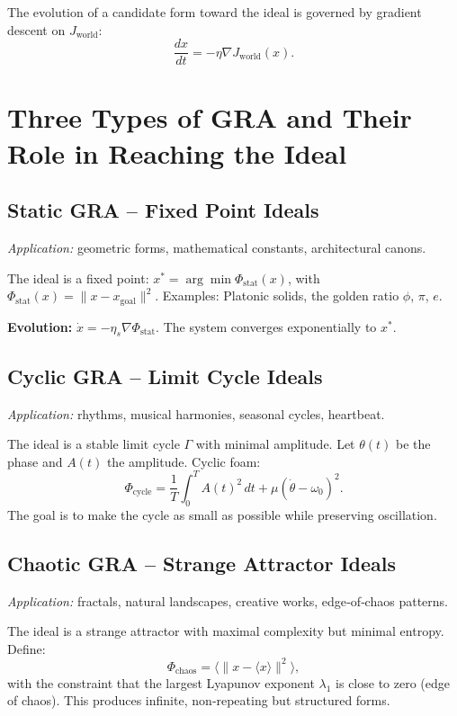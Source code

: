 \documentclass[12pt,a4paper]{article}
\begin{document}
The evolution of a candidate form toward the ideal is governed by gradient descent on \(J_{\text{world}}\):
\[
\frac{dx}{dt} = -\eta \nabla J_{\text{world}}(x).
\]

\section{Three Types of GRA and Their Role in Reaching the Ideal}

\subsection{Static GRA – Fixed Point Ideals}

\emph{Application:} geometric forms, mathematical constants, architectural canons.

The ideal is a fixed point: \(x^* = \arg\min \Phi_{\text{stat}}(x)\), with \(\Phi_{\text{stat}}(x) = \|x - x_{\text{goal}}\|^2\).  
Examples: Platonic solids, the golden ratio \(\phi\), \(\pi\), \(e\).

\textbf{Evolution:} \(\dot{x} = -\eta_s \nabla \Phi_{\text{stat}}\). The system converges exponentially to \(x^*\).

\subsection{Cyclic GRA – Limit Cycle Ideals}

\emph{Application:} rhythms, musical harmonies, seasonal cycles, heartbeat.

The ideal is a stable limit cycle \(\Gamma\) with minimal amplitude. Let \(\theta(t)\) be the phase and \(A(t)\) the amplitude.  
Cyclic foam:
\[
\Phi_{\text{cycle}} = \frac{1}{T}\int_0^T A(t)^2\,dt + \mu (\dot{\theta} - \omega_0)^2.
\]
The goal is to make the cycle as small as possible while preserving oscillation.

\subsection{Chaotic GRA – Strange Attractor Ideals}

\emph{Application:} fractals, natural landscapes, creative works, edge‑of‑chaos patterns.

The ideal is a strange attractor with maximal complexity but minimal entropy. Define:
\[
\Phi_{\text{chaos}} = \langle \|x - \langle x \rangle\|^2 \rangle,
\]
with the constraint that the largest Lyapunov exponent \(\lambda_1\) is close to zero (edge of chaos). This produces infinite, non‑repeating but structured forms.
\end{document}
